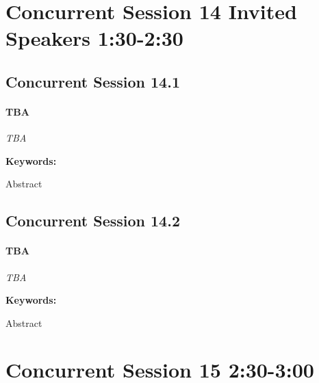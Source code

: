 \documentclass[
]{book}
\begin{document}
\hypertarget{concurrent-session-14-invited-speakers-130-230}{%
\section*{Concurrent Session 14 \textbar{} Invited Speakers \textbar{} 1:30-2:30}\label{concurrent-session-14-invited-speakers-130-230}}

\hypertarget{concurrent-session-14.1}{%
\subsection*{Concurrent Session 14.1}\label{concurrent-session-14.1}}

\begin{speaker}
\hypertarget{tba}{%
\paragraph{\texorpdfstring{\textbf{TBA}}{TBA}}\label{tba}}

\emph{TBA}

\textbf{Keywords:}

Abstract
\end{speaker}

\hypertarget{concurrent-session-14.2}{%
\subsection*{Concurrent Session 14.2}\label{concurrent-session-14.2}}

\begin{speaker}
\hypertarget{tba}{%
\paragraph{\texorpdfstring{\textbf{TBA}}{TBA}}\label{tba}}

\emph{TBA}

\textbf{Keywords:}

Abstract
\end{speaker}

\hypertarget{concurrent-session-15-230-300}{%
\section*{Concurrent Session 15 \textbar{} 2:30-3:00}\label{concurrent-session-15-230-300}}
\end{document}
